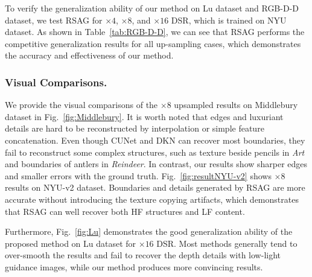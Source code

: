 \documentclass[letterpaper]{article} %
\begin{document}
To verify the generalization ability of our method on Lu dataset and RGB-D-D dataset, we test RSAG for $\times4$, $\times8$, and $\times16$ DSR, which is trained on NYU dataset. As shown in Table~\ref{tab:RGB-D-D}, we can see that RSAG performs the competitive generalization results for all up-sampling cases, which demonstrates the accuracy and effectiveness of our method.

\subsubsection{Visual Comparisons.}
We provide the visual comparisons of the $\times8$ upsampled results on Middlebury dataset in Fig.~\ref{fig:Middlebury}.
It is worth noted that edges and luxuriant details are hard to be reconstructed by interpolation or simple feature concatenation. Even though CUNet \cite{deng2020deep} and DKN \cite{kim2021deformable} can recover most boundaries, they fail to reconstruct some complex structures, such as texture beside pencils in \textit{Art} and boundaries of antlers in \textit{Reindeer}. In contrast, our results show sharper edges and smaller errors with the ground truth.
Fig.~\ref{fig:resultNYU-v2} shows $\times8$ results on NYU-v2 dataset. Boundaries and details generated by RSAG are more accurate without introducing the texture copying artifacts, which demonstrates that RSAG can well recover both HF structures and LF content.

Furthermore, Fig.~\ref{fig:Lu} demonstrates the good generalization ability of the proposed method on Lu dataset for $\times16$ DSR. Most methods generally tend to over-smooth the results and fail to recover the depth details with low-light guidance images, while our method produces more convincing results.


\begin{table}[t]
	\centering
\caption{Ablation studies of RSAG (in MAD) on Middlebury dataset and (in RMSE) on  NYU-v2 dataset  for $\times8$ DSR.}
\label{tab:Ablation1}
\end{table}
\end{document}
